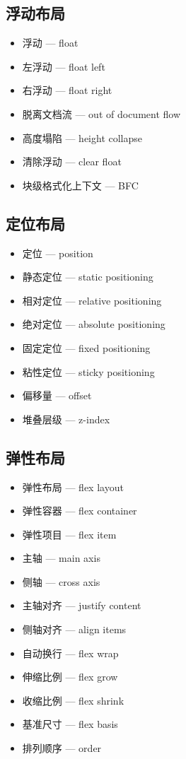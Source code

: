 \subsection{浮动布局}
\begin{itemize}
\item 浮动 — float
\item 左浮动 — float left
\item 右浮动 — float right
\item 脱离文档流 — out of document flow
\item 高度塌陷 — height collapse
\item 清除浮动 — clear float
\item 块级格式化上下文 — BFC
\end{itemize}

\subsection{定位布局}
\begin{itemize}
\item 定位 — position
\item 静态定位 — static positioning
\item 相对定位 — relative positioning
\item 绝对定位 — absolute positioning
\item 固定定位 — fixed positioning
\item 粘性定位 — sticky positioning
\item 偏移量 — offset
\item 堆叠层级 — z-index
\end{itemize}

\subsection{弹性布局}
\begin{itemize}
\item 弹性布局 — flex layout
\item 弹性容器 — flex container
\item 弹性项目 — flex item
\item 主轴 — main axis
\item 侧轴 — cross axis
\item 主轴对齐 — justify content
\item 侧轴对齐 — align items
\item 自动换行 — flex wrap
\item 伸缩比例 — flex grow
\item 收缩比例 — flex shrink
\item 基准尺寸 — flex basis
\item 排列顺序 — order
\end{itemize}


